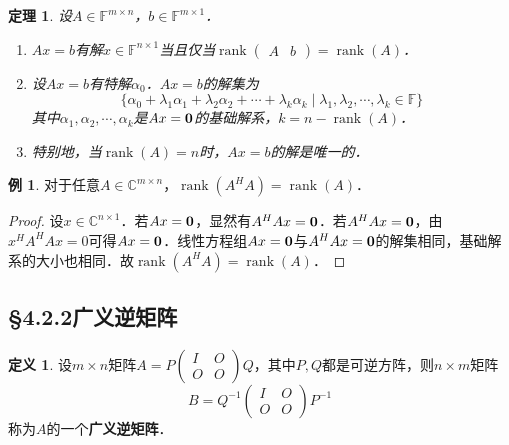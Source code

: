 \documentclass[a4paper,fontset=windows]{ctexbook}
\newtheorem{theorem}{定理}[chapter]
\theoremstyle{definition}
\newtheorem{definition}{定义}[chapter]
\newtheorem{example}{例}[chapter]
\DeclareMathOperator{\rank}{rank}
\begin{document}
\begin{theorem}
设$A\in\mathbb{F}^{m\times n}$，$b\in\mathbb{F}^{m\times 1}$．
\begin{enumerate}
\item $Ax=b$有解$x\in\mathbb{F}^{n\times 1}$当且仅当$\rank\begin{pmatrix}A&b\end{pmatrix}=\rank(A)$．

\item 设$Ax=b$有特解$\alpha_0$．$Ax=b$的解集为
$$\{\alpha_0+\lambda_1\alpha_1+\lambda_2\alpha_2+\cdots+\lambda_k\alpha_k\mid\lambda_1,\lambda_2,\cdots,\lambda_k\in\mathbb{F}\}$$
其中$\alpha_1,\alpha_2,\cdots,\alpha_k$是$Ax={\bf 0}$的基础解系，$k=n-\rank(A)$．

\item 特别地，当$\rank(A)=n$时，$Ax=b$的解是唯一的．
\end{enumerate}
\end{theorem}

\begin{example}
对于任意$A\in\mathbb{C}^{m\times n}$，$\rank(A^HA)=\rank(A)$．
\end{example}

\begin{proof}
设$x\in\mathbb{C}^{n\times 1}$．若$Ax={\bf 0}$，显然有$A^HAx={\bf 0}$．若$A^HAx={\bf 0}$，由$x^HA^HAx=0$可得$Ax={\bf 0}$．线性方程组$Ax={\bf 0}$与$A^HAx={\bf 0}$的解集相同，基础解系的大小也相同．故$\rank(A^HA)=\rank(A)$．
\end{proof}

\subsection*{\S 4.2.2\quad 广义逆矩阵}

\begin{definition}\label{def4.4}
设$m\times n$矩阵$A=P\begin{pmatrix}I&O \\ O&O\end{pmatrix}Q$，其中$P,Q$都是可逆方阵，则$n\times m$矩阵
$$B=Q^{-1}\begin{pmatrix}I&O \\ O&O\end{pmatrix}P^{-1}$$
称为$A$的一个{\bf 广义逆矩阵}．
\end{definition}
\end{document}
